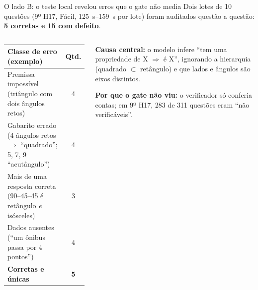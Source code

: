 \documentclass[aspectratio=169,11pt]{beamer}
\begin{document}
\begin{frame}{O lado B: o teste local revelou erros que o gate não media}
  \small
  Dois lotes de 10 questões (9º H17, Fácil, \SI{125}{s}--\SI{159}{s} por lote) foram auditados questão a questão: \textbf{5 corretas e 15 com defeito}.

  \vspace{4pt}
  \begin{columns}[T]
    \footnotesize
    \begin{tabularx}{\textwidth}{@{}Xc@{}}
      \toprule
      \textbf{Classe de erro (exemplo)} & \textbf{Qtd.} \\
      \midrule
      Premissa impossível (triângulo com dois ângulos retos) & 4 \\
      Gabarito errado (4 ângulos retos $\Rightarrow$ ``quadrado''; 5, 7, 9 ``acutângulo'') & 4 \\
      Mais de uma resposta correta (90--45--45 é retângulo \emph{e} isósceles) & 3 \\
      Dados ausentes (``um ônibus passa por 4 pontos'') & 4 \\
      \midrule
      \textbf{Corretas e únicas} & \textbf{5} \\
      \bottomrule
    \end{tabularx}
    \begin{tcolorbox}[colback=lightorange, colframe=warnorange, boxrule=0.5pt, arc=2pt, left=5pt, right=5pt]
      \scriptsize\textbf{Causa central:} o modelo infere ``tem uma propriedade de X $\Rightarrow$ é X'', ignorando a hierarquia (quadrado $\subset$ retângulo) e que lados e ângulos são eixos distintos.

      \vspace{3pt}\textbf{Por que o gate não viu:} o verificador só conferia contas; em 9º H17, 283 de 311 questões eram ``não verificáveis''.
    \end{tcolorbox}
  \end{columns}
\end{frame}

\end{document}
